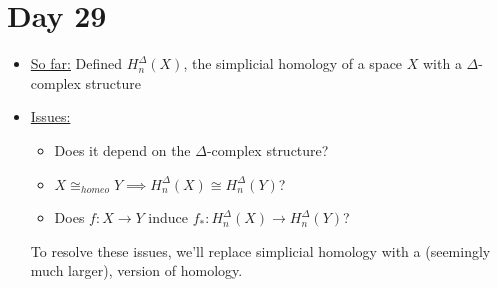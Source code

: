 \documentclass[../notes.tex]{subfiles}
\begin{document}
\section{Day 29}
\begin{itemize}
    \item \underline{So far:} Defined $H_n^{\Delta}(X)$, the simplicial homology of a space
        $X$ with a $\Delta$-complex structure
    \item \underline{Issues:}
        \begin{itemize}
            \item Does it depend on the $\Delta$-complex structure?
            \item $X\cong_{homeo}Y\implies H_n^{\Delta}(X)\cong H_n^{\Delta}(Y)$?
            \item Does $f:X\rightarrow Y$ induce $f_*:H_n^{\Delta}(X)\rightarrow H_n^{\Delta}(Y)$?
        \end{itemize}
        To resolve these issues, we'll replace simplicial homology with a (seemingly much larger), version
        of homology.
\end{itemize}
\end{document}
